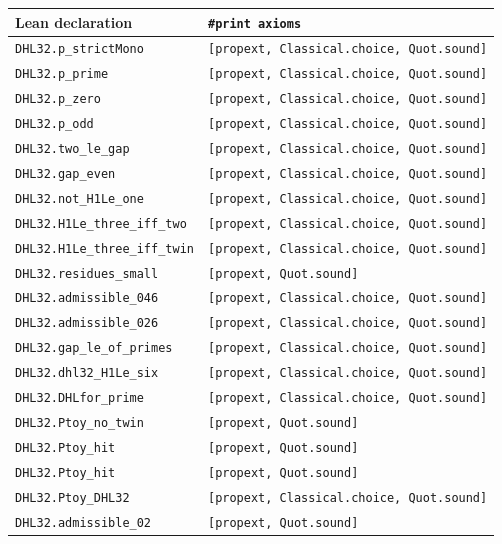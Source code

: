 \documentclass[11pt]{amsart}
\theoremstyle{plain}
\theoremstyle{definition}
\theoremstyle{remark}
\begin{document}
\begin{center}\footnotesize
\begin{tabular}{ll}
\hline
Lean declaration & \texttt{\#print axioms} \\
\hline
\texttt{DHL32.p\_strictMono} & \texttt{[propext, Classical.choice, Quot.sound]} \\
\texttt{DHL32.p\_prime} & \texttt{[propext, Classical.choice, Quot.sound]} \\
\texttt{DHL32.p\_zero} & \texttt{[propext, Classical.choice, Quot.sound]} \\
\texttt{DHL32.p\_odd} & \texttt{[propext, Classical.choice, Quot.sound]} \\
\texttt{DHL32.two\_le\_gap} & \texttt{[propext, Classical.choice, Quot.sound]} \\
\texttt{DHL32.gap\_even} & \texttt{[propext, Classical.choice, Quot.sound]} \\
\texttt{DHL32.not\_H1Le\_one} & \texttt{[propext, Classical.choice, Quot.sound]} \\
\texttt{DHL32.H1Le\_three\_iff\_two} & \texttt{[propext, Classical.choice, Quot.sound]} \\
\texttt{DHL32.H1Le\_three\_iff\_twin} & \texttt{[propext, Classical.choice, Quot.sound]} \\
\texttt{DHL32.residues\_small} & \texttt{[propext, Quot.sound]} \\
\texttt{DHL32.admissible\_046} & \texttt{[propext, Classical.choice, Quot.sound]} \\
\texttt{DHL32.admissible\_026} & \texttt{[propext, Classical.choice, Quot.sound]} \\
\texttt{DHL32.gap\_le\_of\_primes} & \texttt{[propext, Classical.choice, Quot.sound]} \\
\texttt{DHL32.dhl32\_H1Le\_six} & \texttt{[propext, Classical.choice, Quot.sound]} \\
\texttt{DHL32.DHLfor\_prime} & \texttt{[propext, Classical.choice, Quot.sound]} \\
\texttt{DHL32.Ptoy\_no\_twin} & \texttt{[propext, Quot.sound]} \\
\texttt{DHL32.Ptoy\_hit} & \texttt{[propext, Quot.sound]} \\
\texttt{DHL32.Ptoy\_hit\textquotesingle{}} & \texttt{[propext, Quot.sound]} \\
\texttt{DHL32.Ptoy\_DHL32} & \texttt{[propext, Classical.choice, Quot.sound]} \\
\texttt{DHL32.admissible\_02} & \texttt{[propext, Quot.sound]} \\

\end{tabular}
\end{center}
\end{document}
